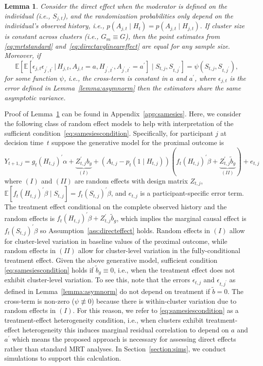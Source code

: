 \documentclass[12pt]{article}
\def\E{\mathbb{E}}
\def\given{\, | \,}
\newtheorem{lemma}[thm]{Lemma}
\begin{document}
\begin{lemma}
\label{lemma:samesies}
Consider the direct effect when the moderator is defined on the individual (i.e., $S_{j,t}$), and the randomization probabilities only depend on the individual's observed history, i.e., $p(A_{j,t} \mid H_t) = p(A_{j,t} \mid H_{j,t})$.  If cluster size is constant across clusters (i.e., $G_m \equiv G$), then the point estimates from \eqref{eq:mrtstandard} and~\eqref{eq:directavglineareffect} are equal for any sample size. Moreover, if
\begin{equation}
    \label{eq:samesiescondition}
    \E \left[ \E \left[ \epsilon_{j,t} \epsilon_{j^\prime, t^\prime} \given H_{j,t}, A_{j,t}=a, H_{j^\prime, t^\prime}, A_{j^\prime, t^\prime} = a^\prime \right] \mid S_{t,j}, S_{t,j^\prime} \right] = \psi(S_{t,j}, S_{t,j^\prime}),
\end{equation}
for some function $\psi$, i.e., the cross-term is constant in $a$ and $a^\prime$, where $\epsilon_{j,t}$ is the error defined in Lemma~\ref{lemma:asymnorm} then the estimators share the same asymptotic variance.
\end{lemma}

Proof of Lemma~\ref{lemma:samesies} can be found in Appendix~\ref{app:samesies}. Here, we consider the following class of random effect models to help with interpretation of the sufficient condition~\eqref{eq:samesiescondition}.  Specifically, for participant $j$ at decision time~$t$ suppose the generative model for the proximal outcome is
$$
Y_{t+1,j} = g_t(H_{t,j})^\prime \alpha + \underbrace{Z_{t,j}^\prime b_g}_{(I)} + (A_{t,j} - p_t(1 \mid H_{t,j})) (f_t( H_{t,j})^\prime \beta + \underbrace{Z_{t,j}^\prime \tilde b_g}_{(II)}) + e_{t,j}
$$
where $(I)$ and $(II)$ are random effects with \textbf{}design matrix $Z_{t,j}$, $\E[ f_t(H_{t,j})^\prime \beta \mid S_{t,j} ] = f_t(S_{t,j})^\prime \beta$, and $e_{t,j}$ is a participant-specific error term.  The treatment effect conditional on the complete observed history and the random effects is $f_t( H_{t,j})^\prime \beta + Z_{t,j}^\prime \tilde b_g$, which implies  the marginal causal effect is $f_t (S_{t,j})^\prime \beta$ so Assumption~\ref{ass:directeffect} holds.  Random effects in $(I)$ allow for cluster-level variation in baseline values of the proximal outcome, while random effects in $(II)$ allow for cluster-level variation in the fully-conditional treatment effect. Given the above generative model, sufficient condition \eqref{eq:samesiescondition} holds if $\tilde b_g \equiv 0$, i.e., when the treatment effect does not exhibit cluster-level variation. To see this, note that the errors $\epsilon_{t,j}$ and $\epsilon_{t,j^\prime}$ as defined in Lemma~\ref{lemma:asymnorm} do not depend on treatment if $\tilde b = 0$.  The cross-term is non-zero ($\psi \not \equiv 0$) because there is within-cluster variation due to random effects in $(I)$.  For this reason, we refer to \eqref{eq:samesiescondition} as a treatment-effect heterogeneity condition, i.e., when clusters exhibit treatment-effect heterogeneity this induces marginal residual correlation to depend on $a$ and $a^\prime$ which means the proposed approach is necessary for assessing direct effects rather than standard MRT analyses. In Section~\ref{section:sims}, we conduct simulations to support this calculation.
\end{document}
